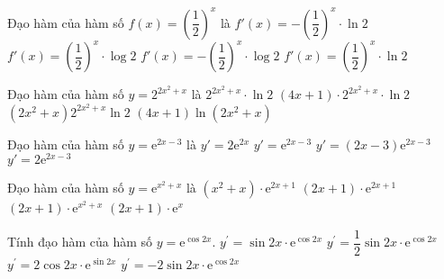\begin{ex}%
	Đạo hàm của hàm số $ f( x )={\left( \dfrac{1}{2} \right)^x}$ là
	\choice
	{\True $f'( x )=-{{\left( \dfrac{1}{2} \right)}^x}\cdot \ln 2 $}
	{ $f'( x )={{\left( \dfrac{1}{2} \right)}^x}\cdot \log 2 $}
	{ $f'( x )=-{{\left( \dfrac{1}{2} \right)}^x}\cdot \log 2 $}
	{ $f'( x )={{\left( \dfrac{1}{2} \right)}^x}\cdot \ln 2 $}
\end{ex}
\begin{ex}%
	Đạo hàm của hàm số $y=2^{2x^2 + x}$ là
	\choice
	{$2^{2x^2 + x}\cdot\ln 2$}
	{\True $(4x + 1)\cdot 2^{2x^2 + x}\cdot\ln 2$}
	{ $\left(2x^2 + x\right) 2^{2x^2 + x}\ln 2$}
	{$(4x + 1)\ln\left(2x^2 + x\right)$}
\end{ex}
\begin{ex}%
	Đạo hàm của hàm số $ y={\mathrm{e}^{2x-3}}$ là
	\choice
	{ $y'=2{\mathrm{e}^{2x}}$}
	{ $y'={\mathrm{e}^{2x-3}}$}
	{ $y'=( 2x-3 ){\mathrm{e}^{2x-3}}$}
	{\True $y'=2{\mathrm{e}^{2x-3}}$}
\end{ex}
\begin{ex}%
	Đạo hàm của hàm số $y=\mathrm{e}^{x^2 + x}$ là
	\choice
	{$\left(x^2 + x\right)\cdot\mathrm{e}^{2x + 1}$}
	{$(2x + 1)\cdot\mathrm{e}^{2x + 1}$}
	{\True $(2x + 1)\cdot\mathrm{e}^{x^2 + x}$}
	{$(2x + 1)\cdot\mathrm{e}^x$}
\end{ex}
\begin{ex}%
	Tính đạo hàm của hàm số $y=\mathrm{e}^{\cos 2x}$.
	\choice
	{$y^{\prime}=\sin 2x\cdot\mathrm{e}^{\cos 2x}$}
	{$y^{\prime}=\dfrac{1}{2}\sin 2x\cdot\mathrm{e}^{\cos 2x}$}
	{ $y^{\prime}=2\cos 2x\cdot\mathrm{e}^{\sin 2x}$}
	{\True $y^{\prime}= - 2\sin 2x\cdot\mathrm{e}^{\cos 2x}$}
\end{ex}

